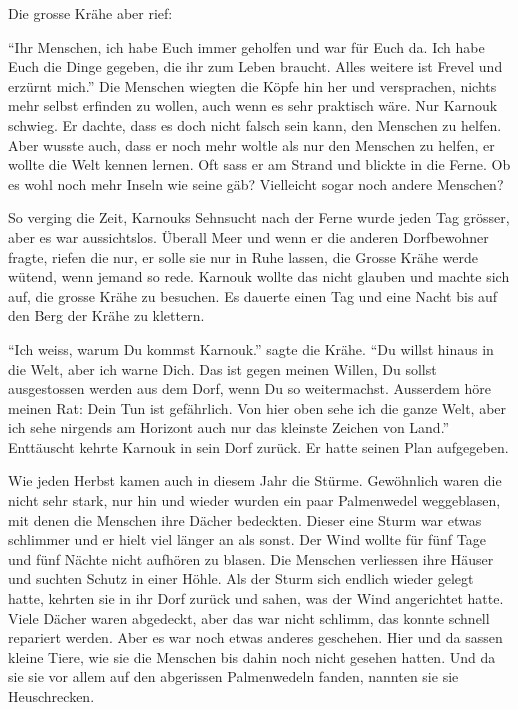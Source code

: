 Die grosse Krähe aber rief: 

\enquote{Ihr Menschen, ich habe Euch immer geholfen und war für Euch da. Ich habe Euch die Dinge gegeben, die ihr zum Leben braucht. Alles weitere ist Frevel und erzürnt mich.} Die Menschen wiegten die Köpfe hin her und versprachen, nichts mehr selbst erfinden zu wollen, auch wenn es sehr praktisch wäre. Nur Karnouk schwieg. Er dachte, dass es doch nicht falsch sein kann, den Menschen zu helfen. Aber wusste auch, dass er noch mehr woltle als nur den Menschen zu helfen, er wollte die Welt kennen lernen. Oft sass er am Strand und blickte in die Ferne. Ob es wohl noch mehr Inseln wie seine gäb? Vielleicht sogar noch andere Menschen?

So verging die Zeit, Karnouks Sehnsucht nach der Ferne wurde jeden Tag grösser, aber es war aussichtslos. Überall Meer und wenn er die anderen Dorfbewohner fragte, riefen die nur, er solle sie nur in Ruhe lassen, die Grosse Krähe werde wütend, wenn jemand so rede. Karnouk wollte das nicht glauben und machte sich auf, die grosse Krähe zu besuchen. Es dauerte einen Tag und eine Nacht bis auf den Berg der Krähe zu klettern.

\enquote{Ich weiss, warum Du kommst Karnouk.} sagte die Krähe. \enquote{Du willst hinaus in die Welt, aber ich warne Dich. Das ist gegen meinen Willen, Du sollst ausgestossen werden aus dem Dorf, wenn Du so weitermachst. Ausserdem höre meinen Rat: Dein Tun ist gefährlich. Von hier oben sehe ich die ganze Welt, aber ich sehe nirgends am Horizont auch nur das kleinste Zeichen von Land.} Enttäuscht kehrte Karnouk in sein Dorf zurück. Er hatte seinen Plan aufgegeben.

Wie jeden Herbst kamen auch in diesem Jahr die Stürme. Gewöhnlich waren die nicht sehr stark, nur hin und wieder wurden ein paar Palmenwedel weggeblasen, mit denen die Menschen ihre Dächer bedeckten. Dieser eine Sturm war etwas schlimmer und er hielt viel länger an als sonst. Der Wind wollte für fünf Tage und fünf Nächte nicht aufhören zu blasen. Die Menschen verliessen ihre Häuser und suchten Schutz in einer Höhle. Als der Sturm sich endlich wieder gelegt hatte, kehrten sie in ihr Dorf zurück und sahen, was der Wind angerichtet hatte. Viele Dächer waren abgedeckt, aber das war nicht schlimm, das konnte schnell repariert werden. Aber es war noch etwas anderes geschehen. Hier und da sassen kleine Tiere, wie sie die Menschen bis dahin noch nicht gesehen hatten. Und da sie sie vor allem auf den abgerissen Palmenwedeln fanden, nannten sie sie Heuschrecken. 

